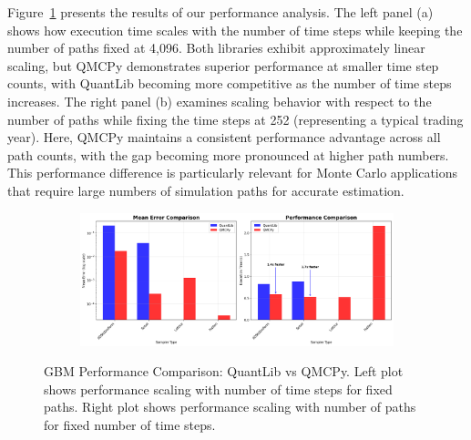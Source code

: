 \documentclass{article}
\begin{document}
Figure~\ref{fig:gbm_performance} presents the results of our performance analysis. The left panel (a) shows how execution time scales with the number of time steps while keeping the number of paths fixed at 4,096. Both libraries exhibit approximately linear scaling, but QMCPy demonstrates superior performance at smaller time step counts, with QuantLib becoming more competitive as the number of time steps increases. The right panel (b) examines scaling behavior with respect to the number of paths while fixing the time steps at 252 (representing a typical trading year). Here, QMCPy maintains a consistent performance advantage across all path counts, with the gap becoming more pronounced at higher path numbers. This performance difference is particularly relevant for Monte Carlo applications that require large numbers of simulation paths for accurate estimation.

\begin{figure}[htbp]
    \centering
    \begin{subfigure}{1\textwidth}
        \centering
        \includegraphics[width=\textwidth]{images/figure_6.png}
    \end{subfigure}
    \caption{GBM Performance Comparison: QuantLib vs QMCPy. Left plot shows performance scaling with number of time steps for fixed paths. Right plot shows performance scaling with number of paths for fixed number of time steps.}
    \label{fig:gbm_performance}
\end{figure}
\end{document}
